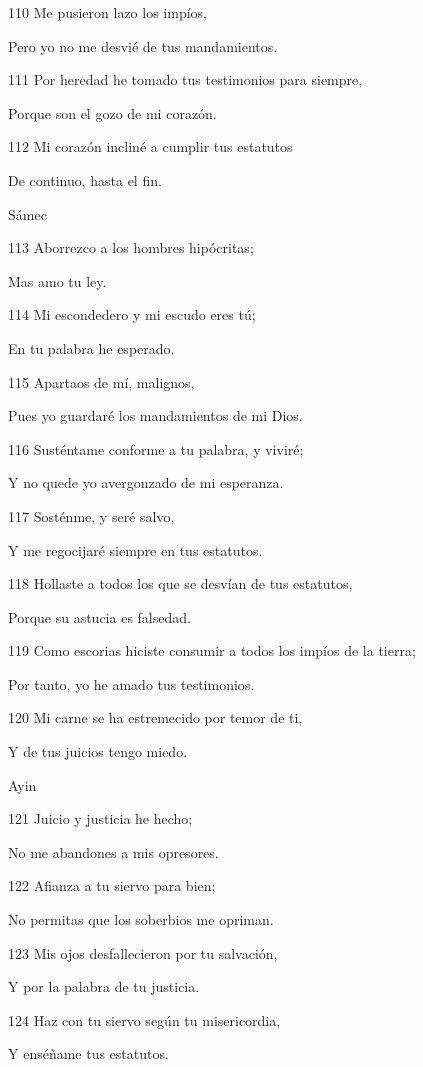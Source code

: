 \par 110 Me pusieron lazo los impíos,
\par Pero yo no me desvié de tus mandamientos.
\par 111 Por heredad he tomado tus testimonios para siempre,
\par Porque son el gozo de mi corazón.
\par 112 Mi corazón incliné a cumplir tus estatutos
\par De continuo, hasta el fin.
\par Sámec
\par 113 Aborrezco a los hombres hipócritas;
\par Mas amo tu ley.
\par 114 Mi escondedero y mi escudo eres tú;
\par En tu palabra he esperado.
\par 115 Apartaos de mí, malignos,
\par Pues yo guardaré los mandamientos de mi Dios.
\par 116 Susténtame conforme a tu palabra, y viviré;
\par Y no quede yo avergonzado de mi esperanza.
\par 117 Sosténme, y seré salvo,
\par Y me regocijaré siempre en tus estatutos.
\par 118 Hollaste a todos los que se desvían de tus estatutos,
\par Porque su astucia es falsedad.
\par 119 Como escorias hiciste consumir a todos los impíos de la tierra;
\par Por tanto, yo he amado tus testimonios.
\par 120 Mi carne se ha estremecido por temor de ti,
\par Y de tus juicios tengo miedo.
\par Ayin
\par 121 Juicio y justicia he hecho;
\par No me abandones a mis opresores.
\par 122 Afianza a tu siervo para bien;
\par No permitas que los soberbios me opriman.
\par 123 Mis ojos desfallecieron por tu salvación,
\par Y por la palabra de tu justicia.
\par 124 Haz con tu siervo según tu misericordia,
\par Y enséñame tus estatutos.
